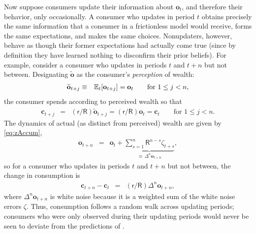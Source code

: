 \documentclass[titlepage]{./econtex}
\begin{document}
Now suppose consumers update their information about $\mathbf{o}_t$, and therefore their behavior, only occasionally.  A consumer who updates in period $t$ obtains precisely the same information that a consumer in a frictionless model would receive, forms the same expectations, and makes the same choices.  Nonupdaters, however, behave as though their former expectations had actually come true (since by definition they have learned nothing to disconfirm their prior beliefs).  For example, consider a consumer who updates in periods $t$ and $t+n$ but not between.  Designating $\widetilde{\mathbf{o}}$ as the consumer's {\it perception} of wealth:
  \begin{eqnarray*}
\widetilde{\mathbf{o}}_{t+j} & \equiv & \operatorname{\mathbb{E}}_{t}[\mathbf{o}_{t+j}] = \mathbf{o}_{t} \qquad \text{for }  1\le j < n,
\end{eqnarray*}
  the consumer spends according to perceived wealth so that
  \begin{eqnarray*}
\mathbf{c}_{t+j} & = & (\mathsf{r}/\mathsf{R})\widetilde{\mathbf{o}}_{t+j} = (\mathsf{r}/\mathsf{R})     \mathbf{o} _{t} = \mathbf{c}_{t} \qquad \text{for }  1\le j < n.
\end{eqnarray*}
The dynamics of actual (as distinct from perceived) wealth are given by \eqref{eq:zAccum},
\begin{eqnarray*}
 \mathbf{o}_{t+n} & = & \mathbf{o}_{t}+\underbrace{\sum_{s=1}^{n} \mathsf{R}^{n-s}\zeta_{t+s}}_{\equiv\,\Delta^{n} \mathbf{o}_{t+n}},
\end{eqnarray*}
 so for a consumer who updates in periods $t$ and $t+n$ but not between, the change in consumption is
\begin{eqnarray*}
         \mathbf{c}_{t+n}-\mathbf{c}_{t}  & = & (\mathsf{r}/\mathsf{R})\Delta^{n}\mathbf{o}_{t+n},
\end{eqnarray*}
  where $\Delta^{n}\mathbf{o}_{t+n}$ is white noise because it is a weighted sum of the white noise errors $\zeta$.  Thus, consumption follows a random walk across updating periods; consumers who were only observed during their updating periods would never be seen to deviate from the predictions of \cite{hallRandomWalk}.
\end{document}
